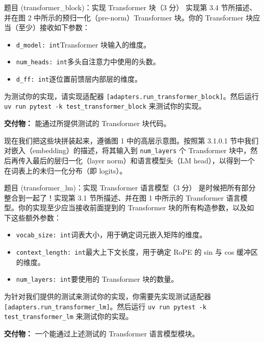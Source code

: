 \begin{problembox}{题目 (transformer\_block)：实现 Transformer 块（3 分）}
实现第 3.4 节所描述、并在图 2 中所示的预归一化（pre-norm）Transformer 块。你的 Transformer 块应当（至少）接收如下参数：

\begin{itemize}[leftmargin=2.4em]
  \item \texttt{d\_model: int}\quad Transformer 块输入的维度。
  \item \texttt{num\_heads: int}\quad 多头自注意力中使用的头数。
  \item \texttt{d\_ff: int}\quad 逐位置前馈层内部层的维度。
\end{itemize}

为测试你的实现，请实现适配器 \texttt{[adapters.run\_transformer\_block]}。然后运行 \texttt{uv run pytest -k test\_transformer\_block} 来测试你的实现。

\textbf{交付物：} 能通过所提供测试的 Transformer 块代码。
\end{problembox}

现在我们把这些块拼装起来，遵循图 1 中的高层示意图。按照第 3.1.0.1 节中我们对嵌入（embedding）的描述，将其输入到 \texttt{num\_layers} 个 Transformer 块中，然后再传入最后的层归一化（layer norm）和语言模型头（LM head），以得到一个在词表上的未归一化分布（即 logits）。

\begin{problembox}{题目 (transformer\_lm)：实现 Transformer 语言模型（3 分）}
是时候把所有部分整合到一起了！实现第 3.1 节所描述、并在图 1 中所示的 Transformer 语言模型。你的实现至少应当接收前面提到的 Transformer 块的所有构造参数，以及如下这些额外参数：

\begin{itemize}[leftmargin=2.4em]
  \item \texttt{vocab\_size: int}\quad 词表大小，用于确定词元嵌入矩阵的维度。
  \item \texttt{context\_length: int}\quad 最大上下文长度，用于确定 RoPE 的 sin 与 cos 缓冲区的维度。
  \item \texttt{num\_layers: int}\quad 要使用的 Transformer 块的数量。
\end{itemize}

为针对我们提供的测试来测试你的实现，你需要先实现测试适配器 \texttt{[adapters.run\_transformer\_lm]}。然后运行 \texttt{uv run pytest -k test\_transformer\_lm} 来测试你的实现。

\textbf{交付物：} 一个能通过上述测试的 Transformer 语言模型模块。
\end{problembox}

